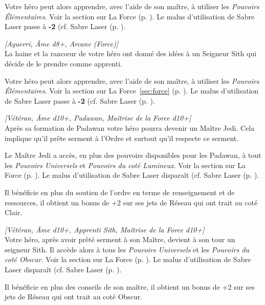 \begin{description}[align=left]
        Votre héro peut alors apprendre, avec l’aide de son maître, à utiliser les \emph{Pouvoirs \'Elémentaires}. Voir la section sur La Force (p. \pageref{sec:force}). Le malus d’utilisation de Sabre Laser passe à \textbf{-2} (cf. Sabre Laser (p. \pageref{sec:sabre-laser}).

    \item [Apprenti Sith]
        \emph{[Aguerri, \^Ame d8+, Arcane (Force)]}\\
        La haine et la ranc\oe{ur} de votre héro ont donné des idées à un Seigneur Sith qui décide de le prendre comme apprenti.

        Votre héro peut alors apprendre, avec l’aide de son maître, à utiliser les \emph{Pouvoirs \'Elémentaires}. Voir la section sur La Force~\ref{sec:force} (p. \pageref{sec:force}). Le malus d’utilisation de Sabre Laser passe à \textbf{-2} (cf. Sabre Laser (p. \pageref{sec:sabre-laser}).

    \item [Maître Jedi]
        \emph{[Vétéran, \^Ame d10+, Padawan, Maîtrise de la Force d10+]}\\
        Après sa formation de Padawan votre héro pourra devenir un Maître Jedi. Cela implique qu’il prête serment à l’Ordre et surtout qu’il respecte ce serment.

        Le Maître Jedi a accès, en plus des pouvoirs disponibles pour les Padawan, à tout les \emph{Pouvoirs Universels} et \emph{Pouvoirs du coté Lumineux}. Voir la section sur La Force (p. \pageref{sec:force}). Le malus d’utilisation de Sabre Laser disparaît (cf. Sabre Laser (p. \pageref{sec:sabre-laser}).

        Il bénéficie en plus du soutien de l’ordre en terme de renseignement et de ressources, il obtient un bonus de +2 sur ses jets de Réseau qui ont trait au coté Clair.

    \item [Seigneur Sith]
        \emph{[Vétéran, \^Ame d10+, Apprenti Sith, Maîtrise de la Force d10+]}\\
        Votre héro, après avoir prêté serment à son Maître, devient à son tour un seigneur Sith. Il accède alors à tous les \emph{Pouvoirs Universels} et les \emph{Pouvoirs du coté Obscur}. Voir la section sur La Force (p. \pageref{sec:force}). Le malus d’utilisation de Sabre Laser disparaît (cf. Sabre Laser (p. \pageref{sec:sabre-laser}).

        Il bénéficie en plus des conseils de son maître, il obtient un bonus de +2 sur ses jets de Réseau qui ont trait au coté Obscur.


\end{description}
